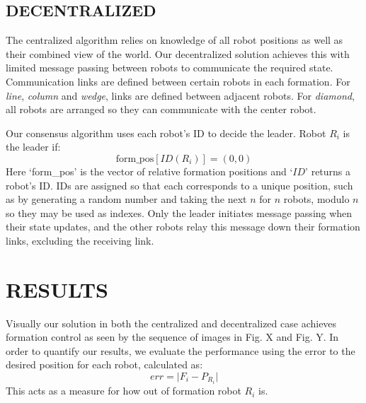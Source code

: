 \documentclass[letterpaper, 10 pt, conference]{ieeeconf}  %
\begin{document}
\subsection{DECENTRALIZED}

The centralized algorithm relies on knowledge of all robot positions as well as their combined view of the world. Our decentralized solution achieves this with limited message passing between robots to communicate the required state. Communication links are defined between certain robots in each formation. For \textit{line}, \textit{column} and \textit{wedge}, links are defined between adjacent robots. For \textit{diamond}, all robots are arranged so they can communicate with the center robot.

Our consensus algorithm uses each robot's ID to decide the leader. Robot $R_i$ is the leader if:
\[\text{form\_pos}[ID(R_i)] = (0,0)\]
Here `form\_pos' is the vector of relative formation positions and `$ID$' returns a robot's ID. IDs are assigned so that each corresponds to a unique position, such as by generating a random number and taking the next $n$ for $n$ robots, modulo $n$ so they may be used as indexes. Only the leader initiates message passing when their state updates, and the other robots relay this message down their formation links, excluding the receiving link.

\section{RESULTS}

Visually our solution in both the centralized and decentralized case achieves formation control as seen by the sequence of images in Fig. X and Fig. Y. In order to quantify our results, we evaluate the performance using the error to the desired position for each robot, calculated as:
\[err = \lvert F_i - P_{R_i}\rvert\]
This acts as a measure for how out of formation robot $R_i$ is.


\end{document}
